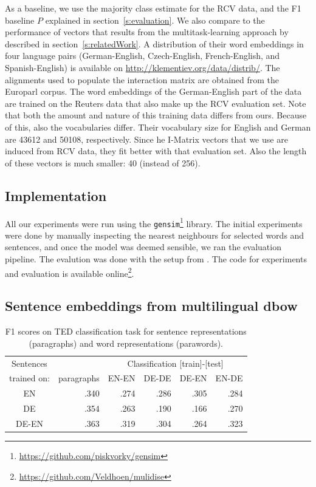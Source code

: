 As a baseline, we use the majority class estimate for the RCV data, and the F1 baseline $P$ explained in section~\ref{s:evaluation}. We also compare to the performance of vectors that results from the multitask-learning approach by \cite{klementiev2012inducing} described in section~\ref{s:relatedWork}. A distribution of their word embeddings in four language pairs (German-English, Czech-English, French-English, and Spanish-English) is available on \url{http://klementiev.org/data/distrib/}. The alignments used to populate the interaction matrix are obtained from the Europarl corpus. The word embeddings of the German-English part of the data are trained on the Reuters data that also make up the RCV evaluation set. Note that both the amount and nature of this training data differs from ours. Because of this, also the vocabularies differ. Their vocabulary size for English and German are 43612 and 50108, respectively. Since he I-Matrix vectors that we use are induced from RCV data, they fit better with that evaluation set. Also the length of these vectors is much smaller: 40 (instead of 256).



\subsection{Implementation}

All our experiments were run using the \texttt{gensim}\footnote{\url{https://github.com/piskvorky/gensim}} library.
The initial experiments were done by manually inspecting the nearest neighbours for selected words and sentences, and once the model was deemed sensible, we ran the evaluation pipeline.
The evalution was done with the setup from \cite{klementiev2012inducing}.
The code for experiments and evaluation is available online\footnote{\url{https://github.com/Veldhoen/mulidise}}.



\subsection{Sentence embeddings from multilingual dbow}
\begin{table}[htb]
\center
\begin{tabular}{c | r|r r r r }
Sentences 		&		&	\multicolumn{4}{c}{Classification [train]-[test]}	\\
trained on: 		&paragraphs	&EN-EN	&DE-DE	&DE-EN	&EN-DE		\\\hline
EN			&.340		&.274		&.286		&.305		&.284		\\
DE			&.354		&.263		&.190		&.166		&.270		\\
DE-EN			&.363		&.319		&.304		&.264		&.323		\\
\end{tabular}
\caption{F1 scores on TED classification task for sentence representations (paragraphs) and word representations (parawords).}
\label{t:dbow_mono_bi}
\end{table}

